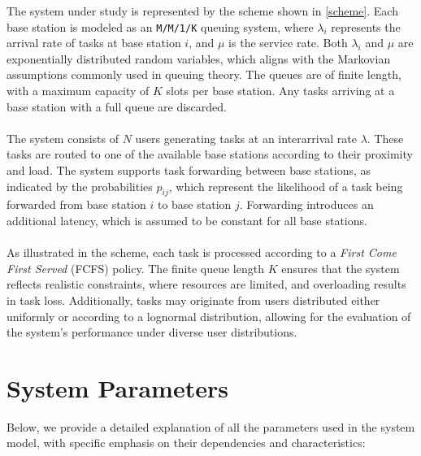 \documentclass{report}
\begin{document}
The system under study is represented by the scheme shown in \autoref{scheme}. Each base station is modeled as an \texttt{M/M/1/K} queuing system, where $\lambda_i$ represents the arrival rate of tasks at base station $i$, and $\mu$ is the service rate. Both $\lambda_i$ and $\mu$ are exponentially distributed random variables, which aligns with the Markovian assumptions commonly used in queuing theory. The queues are of finite length, with a maximum capacity of $K$ slots per base station. Any tasks arriving at a base station with a full queue are discarded.\\\\
The system consists of $N$ users generating tasks at an interarrival rate $\lambda$. These tasks are routed to one of the available base stations according to their proximity and load. The system supports task forwarding between base stations, as indicated by the probabilities $p_{ij}$, which represent the likelihood of a task being forwarded from base station $i$ to base station $j$. Forwarding introduces an additional latency, which is assumed to be constant for all base stations.\\\\
As illustrated in the scheme, each task is processed according to a \textit{First Come First Served} (FCFS) policy. The finite queue length $K$ ensures that the system reflects realistic constraints, where resources are limited, and overloading results in task loss. Additionally, tasks may originate from users distributed either uniformly or according to a lognormal distribution, allowing for the evaluation of the system's performance under diverse user distributions.

\section{System Parameters}
Below, we provide a detailed explanation of all the parameters used in the system model, with specific emphasis on their dependencies and characteristics:
\end{document}
